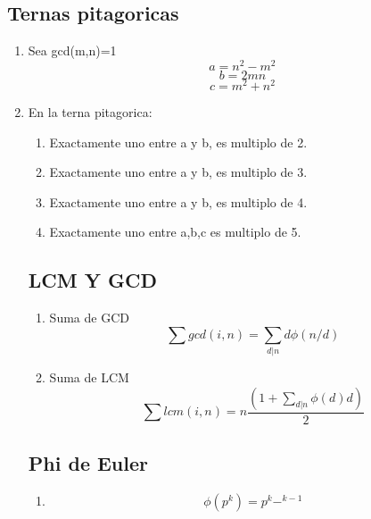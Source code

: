 \subsection{Ternas pitagoricas}

\begin{enumerate}
\item
Sea gcd(m,n)=1
\begin{equation}
  a=n^2-m^2
\end{equation}
\begin{equation}
  b=2mn
\end{equation}
\begin{equation}
  c=m^2+n^2
\end{equation}

\item
En la terna pitagorica:
\begin{enumerate}
  \item
  Exactamente uno entre a y b, es multiplo de 2.
  \item
  Exactamente uno entre a y b, es multiplo de 3.
  \item
  Exactamente uno entre a y b, es multiplo de 4.
  \item
  Exactamente uno entre a,b,c  es multiplo de 5.
\end{enumerate}


\subsection{LCM Y GCD}

\begin{enumerate}
\item
Suma de GCD
\begin{equation}
    \sum gcd(i,n)=\sum_{d|n}{d\phi(n/d)}
\end{equation}
\item
Suma de LCM
\begin{equation}
    \sum lcm(i,n)=n\frac{(1+\sum_{d|n}\phi(d)d)}{2}
\end{equation}
\end{enumerate}

%
%
\subsection{Phi de Euler}
\begin{enumerate}
\item
\begin{equation}
  \phi(p^{k})=p^k-^{k-1}
\end{equation}


\end{enumerate}
\end{enumerate}
